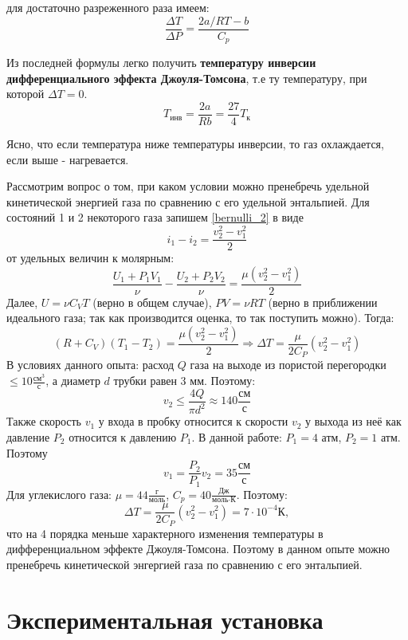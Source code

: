 \documentclass[15pt,a5paper,reqno]{article}
\begin{document}
     для достаточно разреженного раза имеем:
    \begin{equation}\label{coeff}
        \boxed{\frac{\Delta T}{\Delta P} = \frac{2a/RT - b}{C_p}}
    \end{equation}

    Из последней формулы легко получить \textbf{температуру инверсии дифференциального эффекта Джоуля-Томсона}, т.е ту температуру, при которой $\Delta T = 0$.
    \begin{equation}\label{T_inv}
        \boxed{T_{\text{инв}} = \frac{2a}{Rb} = \frac{27}{4}T_{\text{к}}}
    \end{equation}
    
    Ясно, что если температура ниже температуры инверсии, то газ охлаждается, если выше - нагревается.
    
    Рассмотрим вопрос о том, при каком условии можно пренебречь удельной кинетической энергией газа по сравнению с его удельной энтальпией. Для состояний 1 и 2 некоторого газа запишем \eqref{bernulli_2} в виде
    \[i_1 - i_2 = \frac{v_2^2 - v_1^2}{2}\]
     от удельных величин к молярным:
    \[\frac{U_1 + P_1V_1}{\nu} - \frac{U_2 + P_2V_2}{\nu} = \frac{\mu(v_2^2 - v_1^2)}{2}\]
    Далее, $U = \nu C_VT$ (верно в общем случае), $PV = \nu RT$ (верно в приближении идеального газа; так как производится оценка, то так поступить можно). Тогда:
    \[(R + C_V)(T_1 - T_2) = \frac{\mu(v_2^2 - v_1^2)}{2} \Rightarrow \Delta T = \frac{\mu}{2C_P}(v_2^2 - v_1^2)\]
    В условиях данного опыта: расход $Q$ газа на выходе из пористой перегородки $\leq 10 \frac{\text{см}^3}{\text{с}}$, а диаметр $d$ трубки равен 3 мм. Поэтому:
    \[v_2 \leq \frac{4Q}{\pi d^2} \approx 140 \frac{\text{см}}{\text{с}}\]
    Также скорость $v_1$ у входа в пробку относится к скорости $v_2$ у выхода из неё как давление $P_2$ относится к давлению $P_1$. В данной работе: $P_1 = 4\text{ атм}$, $P_2 = 1\text{ атм}$. Поэтому
    \[v_1 = \frac{P_2}{P_1}v_2 = 35\frac{\text{см}}{\text{с}}\]
    Для углекислого газа: $\mu = 44\frac{\text{г}}{\text{моль}}$, $C_p = 40\frac{\text{Дж}}{\text{моль}\cdot\text{К}}$. Поэтому:
    \[\Delta T = \frac{\mu}{2C_P}(v_2^2 - v_1^2) = 7\cdot 10^{-4}\text{К},\]
    что на 4 порядка меньше характерного изменения температуры в дифференциальном эффекте Джоуля-Томсона. Поэтому в данном опыте можно пренебречь кинетической энгергией газа по сравнению с его энтальпией.

\section{Экспериментальная установка}
\end{document}
